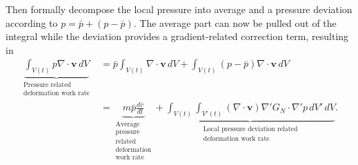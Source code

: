 Then formally decompose the local pressure into average and a pressure deviation according to $p=\bar p+(p-\bar p)$. The average part can now be pulled out of the integral while the deviation provides a gradient-related correction term, resulting in
\begin{align}
    \underbrace{\int_{V(t)}p\nabla\cdot\bm v\,dV}_{\substack{\text{Pressure related}\\\text{deformation work rate}}}
    &=
    \bar p\int_{V(t)}\nabla\cdot\bm v\,dV
    +
    \int_{V(t)}(p-\bar p)\nabla\cdot\bm v\,dV\\
    &=
    \underbrace{m\bar p\frac{d\bar v}{dt}}_{\substack{\text{Average}\\\text{pressure}\\\text{related}\\\text{deformation}\\\text{work rate}}}
    +
    \underbrace{\int_{V(t)}
    \int_{V'(t)}
    (\nabla\cdot\bm v)
    \nabla'G_N\cdot\nabla'p\,
    dV'\,dV}_{\substack{\text{Local pressure deviation related}\\\text{deformation work rate}}}.
\end{align}

